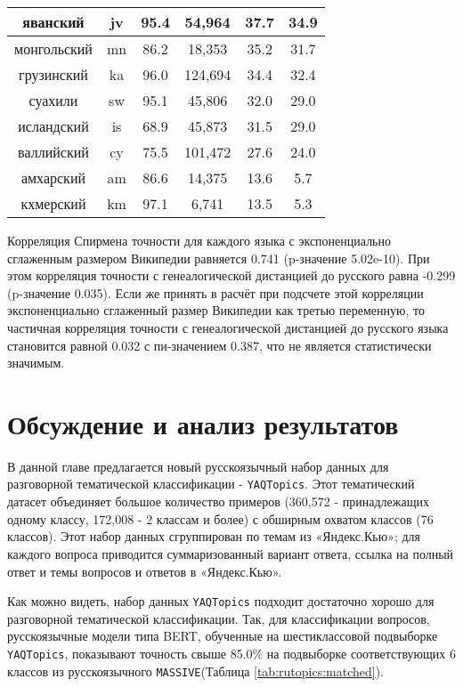 \begin{table*}
{\begin{tabular}{|c|c|c||c|c|c|}
яванский & jv & 95.4 & 54,964 & 37.7 & 34.9\\ \hline
монгольский & mn & 86.2 & 18,353 & 35.2 & 31.7\\ \hline
грузинский & ka & 96.0 & 124,694 & 34.4 & 32.4\\ \hline
суахили & sw & 95.1 & 45,806 & 32.0 & 29.0\\ \hline
исландский & is & 68.9 & 45,873 & 31.5 & 29.0\\ \hline
валлийский & cy & 75.5 & 101,472 & 27.6 & 24.0\\ \hline
амхарский & am & 86.6 & 14,375 & 13.6 & 5.7\\ \hline
кхмерский & km & 97.1 & 6,741 & 13.5 & 5.3\\ \hline
\end{tabular}
}
\end{table*}
Корреляция Спирмена точности для каждого языка с экспоненциально сглаженным размером Википедии равняется 0.741 (p-значение 5.02e-10). При этом корреляция точности с генеалогической дистанцией до русского равна -0.299 (p-значение 0.035). Если же принять в расчёт при подсчете этой корреляции экспоненциально сглаженный размер Википедии как третью переменную, то частичная корреляция точности с генеалогической дистанцией до русского языка становится равной 0.032 с пи-значением 0.387, что не является статистически значимым.


\section{Обсуждение и анализ результатов} 

В данной главе предлагается новый русскоязычный набор данных для разговорной тематической классификации - \texttt{YAQTopics}. Этот тематический датасет объединяет большое количество примеров (360,572 - принадлежащих одному классу, 172,008 - 2 классам и более) с обширным охватом классов (76 классов). Этот набор данных сгруппирован по темам из «Яндекс.Кью»; для каждого вопроса приводится суммаризованный вариант ответа, ссылка на полный ответ и темы вопросов и ответов в «Яндекс.Кью».

Как можно видеть, набор данных \texttt{YAQTopics} подходит достаточно хорошо для разговорной тематической классификации. Так, для классификации вопросов, русскоязычные модели типа BERT, обученные на шестиклассовой подвыборке \texttt{YAQTopics}, показывают точность свыше 85.0\% на подвыборке соответствующих 6 классов из русскоязычного \texttt{MASSIVE}(Таблица \ref{tab:rutopics:matched}). 

